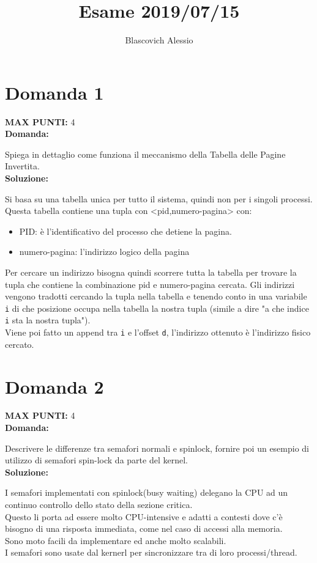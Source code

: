 \documentclass{article}
\title{Esame 2019/07/15}
\author{Blascovich Alessio}
\date{}
\begin{document}
    \maketitle
    \section*{Domanda 1}
    \textbf{MAX PUNTI:} 4\\
    \textbf{Domanda:}


    Spiega in dettaglio come funziona il meccanismo della Tabella delle Pagine Invertita.\\
    \textbf{Soluzione:}


    Si basa su una tabella unica per tutto il sistema, quindi non per i singoli processi.\\
    Questa tabella contiene una tupla con <pid,numero-pagina> con:
    \begin{itemize}
        \item PID: è l'identificativo del processo che detiene la pagina.
        \item numero-pagina: l'indirizzo logico della pagina
    \end{itemize}
    Per cercare un indirizzo bisogna quindi scorrere tutta la tabella per trovare la tupla che contiene la combinazione pid e numero-pagina cercata.
    Gli indirizzi vengono tradotti cercando la tupla nella tabella e tenendo conto in una variabile \verb+i+ di che posizione occupa nella tabella la nostra tupla (simile a dire "a che indice \verb+i+ sta la nostra tupla").\\
    Viene poi fatto un append tra \verb+i+ e l'offset \verb+d+, l'indirizzo ottenuto è l'indirizzo fisico cercato.
    \section*{Domanda 2}
    \textbf{MAX PUNTI:} 4\\
    \textbf{Domanda:}


    Descrivere le differenze tra semafori normali e spinlock, fornire poi un esempio di utilizzo di semafori spin-lock da parte del kernel.\\
    \textbf{Soluzione:}


    I semafori implementati con spinlock(busy waiting) delegano la CPU ad un continuo controllo dello stato della sezione critica.\\
    Questo li porta ad essere molto CPU-intensive e adatti a contesti dove c'è bisogno di una risposta immediata, come nel caso di accessi alla memoria.\\
    Sono moto facili da implementare ed anche molto scalabili.\\
    I semafori sono usate dal kernerl per sincronizzare tra di loro processi/thread.
\end{document}

